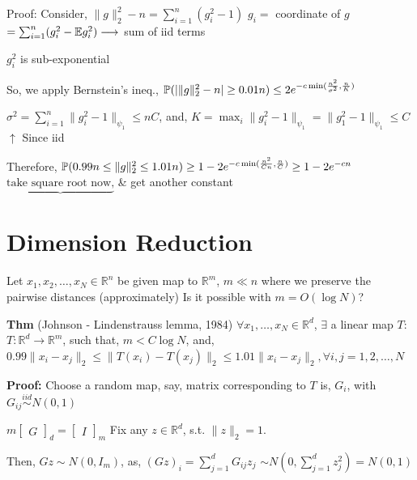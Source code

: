 \documentclass[12pt]{article}
\begin{document}
Proof: Consider, $\|g\|_2^2 - n = \sum_{i=1}^n (g_i^2 - 1)$ \hspace*{2cm} $g_i =$ coordinate of $g$
\hspace*{4cm} $= \sum_{i=1}^n (g_i^2 - \mathbb{E} g_i^2) \longrightarrow$ sum of iid terms

$g_i^2$ is sub-exponential

So, we apply Bernstein's ineq., $\mathbb{P}(|\|g\|_2^2 - n| \geq 0.01 n) \leq 2e^{-c \min(\frac{n^2}{\sigma^2}, \frac{n}{K})}$

$\sigma^2 = \sum_{i=1}^n \|g_i^2 - 1\|_{\psi_1} \leq n C$, and, $K = \max_i \|g_i^2 - 1\|_{\psi_1} = \|g_1^2 - 1\|_{\psi_1} \leq C$
\hspace*{8cm} $\uparrow$
\hspace*{8cm} Since iid

Therefore, $\mathbb{P}(0.99 n \leq \|g\|_2^2 \leq 1.01 n) \geq 1 - 2e^{-c \min(\frac{n^2}{Cn}, \frac{n}{C})} \geq 1 - 2e^{-cn}$
\hspace*{2cm} $\underbrace{\text{take square root now,}}$
\hspace*{2cm} \& get another constant

\section*{Dimension Reduction}

Let $x_1, x_2, \ldots, x_N \in \mathbb{R}^n$ be given map to $\mathbb{R}^m$, $m \ll n$
where we preserve the pairwise distances (approximately)
Is it possible with $m = O(\log N)$?

\textbf{Thm} (Johnson - Lindenstrauss lemma, 1984) $\forall x_1, \ldots, x_N \in \mathbb{R}^d$, $\exists$ a linear map $T$:
$T: \mathbb{R}^d \to \mathbb{R}^m$, such that, $m < C \log N$, and,
$0.99 \|x_i - x_j\|_2 \leq \|T(x_i) - T(x_j)\|_2 \leq 1.01 \|x_i - x_j\|_2, \forall i,j=1,2,\ldots,N$

\textbf{Proof:} Choose a random map, say, matrix corresponding to $T$ is, $G_i$, with $G_{ij} \stackrel{iid}{\sim} N(0,1)$

$m \begin{bmatrix} G \end{bmatrix}_d = \begin{bmatrix} I \end{bmatrix}_m$ \hspace{2cm} Fix any $z \in \mathbb{R}^d$, s.t. $\|z\|_2 = 1$.

\hspace{4cm} Then, $Gz \sim N(0,I_m)$, as, $(Gz)_i = \sum_{j=1}^d G_{ij} z_j$
\hspace{7cm} $\sim N(0, \sum_{j=1}^d z_j^2) = N(0,1)$
\end{document}
